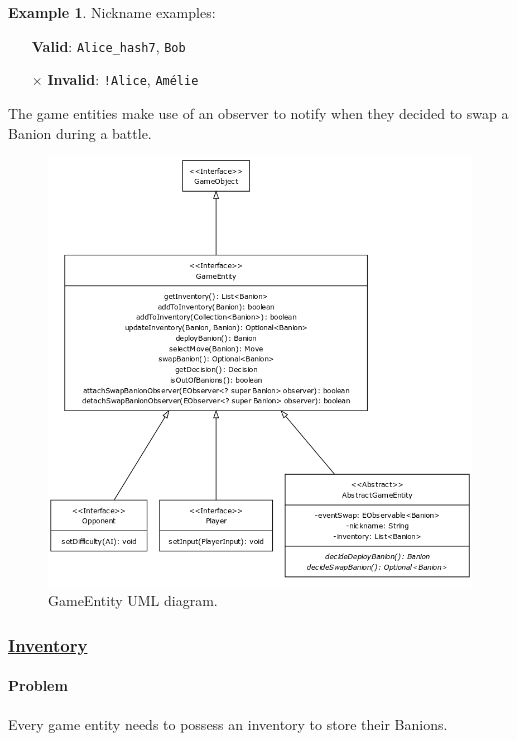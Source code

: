 \documentclass[12pt, a4paper]{report}
\theoremstyle{definition}
\newtheorem{exmp}{Example}[section]
\begin{document}
    \begin{exmp}
        Nickname examples:
        \begin{itemize}
            \item[\checkmark] \textbf{Valid}: \verb|Alice_hash7|, \verb|Bob|
            \item[$\times$] \textbf{Invalid}: \verb|!Alice|, \verb|Amélie|
        \end{itemize}
    \end{exmp}

    The game entities make use of an observer to notify when they decided to swap a Banion during a battle.

    \begin{figure}[H]
    \centering{}
    \caption{GameEntity UML diagram.}
    \includegraphics[width=\textwidth]{game_entity_uml}
    \end{figure}

    \subsubsection{\underline{Inventory}}
    \paragraph{Problem}
    Every game entity needs to possess an inventory to store their Banions.
\end{document}
